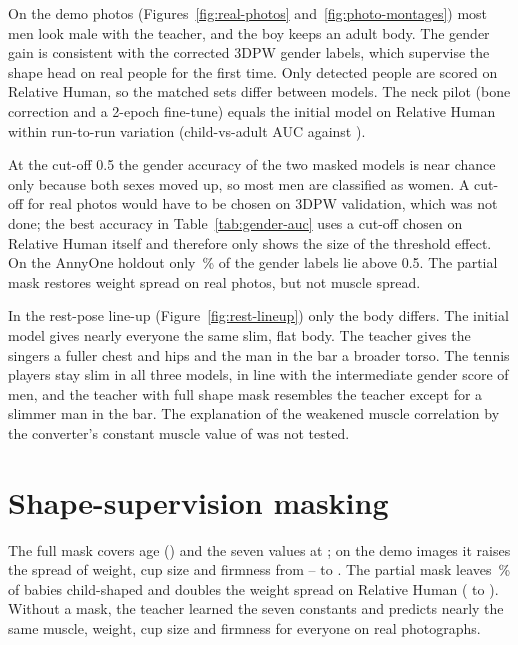 On the demo photos (Figures~\ref{fig:real-photos} and~\ref{fig:photo-montages}) most men look male with the teacher,
and the boy keeps an adult body. The gender gain is consistent with the corrected 3DPW gender labels, which supervise
the shape head on real people for the first time. Only detected people are scored on Relative Human, so the matched
sets differ between models. The neck pilot (bone correction and a 2-epoch fine-tune) equals the initial model on
Relative Human within run-to-run variation (child-vs-adult AUC \RHAUCNeckPilot{} against \RHAUCBase).

At the cut-off 0.5 the gender accuracy of the two masked models is near chance only because both sexes moved up, so
most men are classified as women. A cut-off for real photos would have to be chosen on 3DPW validation, which was not
done; the best accuracy in Table~\ref{tab:gender-auc} uses a cut-off chosen on Relative Human itself and therefore
only shows the size of the threshold effect. On the AnnyOne holdout only \HoldGenderLabelAboveHalf\,\% of the gender
labels lie above 0.5. The partial mask restores weight spread on real photos, but not muscle spread.

In the rest-pose line-up (Figure~\ref{fig:rest-lineup}) only the body differs. The initial model gives nearly
everyone the same slim, flat body. The teacher gives the singers a fuller chest and hips and the man in the bar a
broader torso. The tennis players stay slim in all three models, in line with the intermediate gender score of men,
and the teacher with full shape mask resembles the teacher except for a slimmer man in the bar. The explanation of
the weakened muscle correlation by the converter's constant muscle value of \MethodConstOther{} was not tested.

\section{Shape-supervision masking}

The full mask covers age (\MethodConstAge) and the seven values at \MethodConstOther; on the demo images it raises the
spread of weight, cup size and firmness from \SpreadWeightFinal--\SpreadCupFinal{} to \SpreadWeightMasked. The partial
mask leaves \RHBabiesBelowPartial\,\% of babies child-shaped and doubles the weight spread on Relative Human
(\RHSpreadWeightFinal{} to \RHSpreadWeightPartial). Without a mask, the teacher learned the seven constants and
predicts nearly the same muscle, weight, cup size and firmness for everyone on real photographs.

